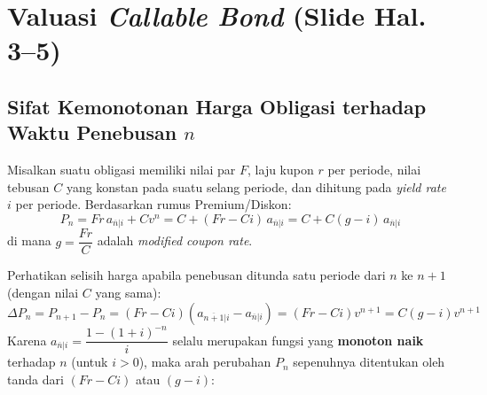 \documentclass[11pt,a4paper]{article}
\begin{document}
\section{Valuasi \textit{Callable Bond} (Slide Hal. 3--5)}

\subsection{Sifat Kemonotonan Harga Obligasi terhadap Waktu Penebusan $n$}

Misalkan suatu obligasi memiliki nilai par $F$, laju kupon $r$ per periode, nilai tebusan $C$ yang konstan pada suatu selang periode, dan dihitung pada \textit{yield rate} $i$ per periode. Berdasarkan rumus Premium/Diskon:
\begin{equation}
    P_n = Fr \, a_{\overline{n}|i} + C v^n = C + (Fr - Ci) \, a_{\overline{n}|i} = C + C(g - i) \, a_{\overline{n}|i}
\end{equation}
di mana $g = \dfrac{Fr}{C}$ adalah \textit{modified coupon rate}.

Perhatikan selisih harga apabila penebusan ditunda satu periode dari $n$ ke $n+1$ (dengan nilai $C$ yang sama):
\begin{equation}
    \Delta P_n = P_{n+1} - P_n = (Fr - Ci)\left(a_{\overline{n+1}|i} - a_{\overline{n}|i}\right) = (Fr - Ci) v^{n+1} = C(g - i) v^{n+1}
\end{equation}
Karena $a_{\overline{n}|i} = \dfrac{1 - (1+i)^{-n}}{i}$ selalu merupakan fungsi yang \textbf{monoton naik} terhadap $n$ (untuk $i > 0$), maka arah perubahan $P_n$ sepenuhnya ditentukan oleh tanda dari $(Fr - Ci)$ atau $(g - i)$:
\end{document}
